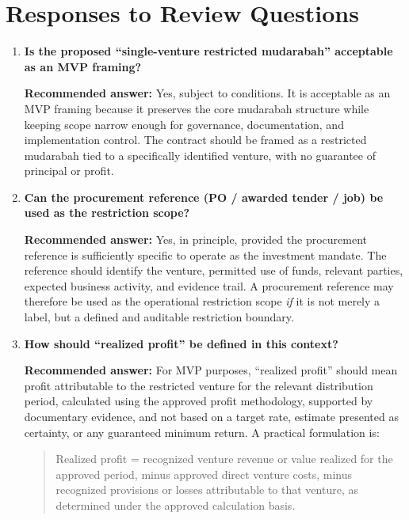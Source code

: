 \documentclass[11pt]{article}
\begin{document}
\section*{Responses to Review Questions}

\begin{enumerate}[leftmargin=1.8em,label=\textbf{Q\arabic*.}]
    \item \textbf{Is the proposed ``single-venture restricted mudarabah'' acceptable as an MVP framing?}

    \textbf{Recommended answer:} Yes, subject to conditions. It is acceptable as an MVP framing because it preserves the core mudarabah structure while keeping scope narrow enough for governance, documentation, and implementation control. The contract should be framed as a restricted mudarabah tied to a specifically identified venture, with no guarantee of principal or profit.

    \item \textbf{Can the procurement reference (PO / awarded tender / job) be used as the restriction scope?}

    \textbf{Recommended answer:} Yes, in principle, provided the procurement reference is sufficiently specific to operate as the investment mandate. The reference should identify the venture, permitted use of funds, relevant parties, expected business activity, and evidence trail. A procurement reference may therefore be used as the operational restriction scope \emph{if} it is not merely a label, but a defined and auditable restriction boundary.

    \item \textbf{How should ``realized profit'' be defined in this context?}

    \textbf{Recommended answer:} For MVP purposes, ``realized profit'' should mean profit attributable to the restricted venture for the relevant distribution period, calculated using the approved profit methodology, supported by documentary evidence, and not based on a target rate, estimate presented as certainty, or any guaranteed minimum return. A practical formulation is:

    \begin{quote}
    Realized profit = recognized venture revenue or value realized for the approved period,
    minus approved direct venture costs, minus recognized provisions or losses attributable
    to that venture, as determined under the approved calculation basis.
    \end{quote}


\end{enumerate}
\end{document}
